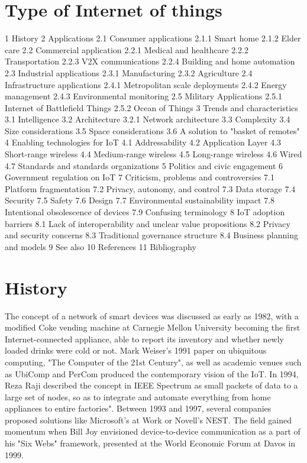 \documentclass[oneside, 11 pt]{report}
\begin{document}
\section{Type of Internet of things}
1	History
2	Applications
2.1	Consumer applications
2.1.1	Smart home
2.1.2	Elder care
2.2	Commercial application
2.2.1	Medical and healthcare
2.2.2	Transportation
2.2.3	V2X communications
2.2.4	Building and home automation
2.3	Industrial applications
2.3.1	Manufacturing
2.3.2	Agriculture
2.4	Infrastructure applications
2.4.1	Metropolitan scale deployments
2.4.2	Energy management
2.4.3	Environmental monitoring
2.5	Military Applications
2.5.1	Internet of Battlefield Things
2.5.2	Ocean of Things
3	Trends and characteristics
3.1	Intelligence
3.2	Architecture
3.2.1	Network architecture
3.3	Complexity
3.4	Size considerations
3.5	Space considerations
3.6	A solution to "basket of remotes"
4	Enabling technologies for IoT
4.1	Addressability
4.2	Application Layer
4.3	Short-range wireless
4.4	Medium-range wireless
4.5	Long-range wireless
4.6	Wired
4.7	Standards and standards organizations
5	Politics and civic engagement
6	Government regulation on IoT
7	Criticism, problems and controversies
7.1	Platform fragmentation
7.2	Privacy, autonomy, and control
7.3	Data storage
7.4	Security
7.5	Safety
7.6	Design
7.7	Environmental sustainability impact
7.8	Intentional obsolescence of devices
7.9	Confusing terminology
8	IoT adoption barriers
8.1	Lack of interoperability and unclear value propositions
8.2	Privacy and security concerns
8.3	Traditional governance structure
8.4	Business planning and models
9	See also
10	References
11	Bibliography
\section{History}
The concept of a network of smart devices was discussed as early as 1982, with a modified Coke vending machine at Carnegie Mellon University becoming the first Internet-connected appliance, able to report its inventory and whether newly loaded drinks were cold or not. Mark Weiser's 1991 paper on ubiquitous computing, "The Computer of the 21st Century", as well as academic venues such as UbiComp and PerCom produced the contemporary vision of the IoT. In 1994, Reza Raji described the concept in IEEE Spectrum as  small packets of data to a large set of nodes, so as to integrate and automate everything from home appliances to entire factories". Between 1993 and 1997, several companies proposed solutions like Microsoft's at Work or Novell's NEST. The field gained momentum when Bill Joy envisioned device-to-device communication as a part of his "Six Webs" framework, presented at the World Economic Forum at Davos in 1999.
\end{document}
